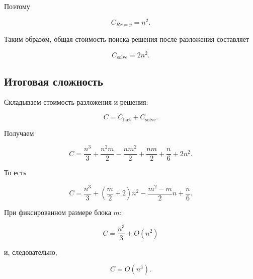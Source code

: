 \documentclass[a4paper,12pt]{article}
\begin{document}
Поэтому

$$
C_{Rx=y}=n^2.
$$

Таким образом, общая стоимость поиска решения после разложения составляет

$$
C_{\text{solve}}
=
2n^2.
$$

\subsection{Итоговая сложность}

Складываем стоимость разложения и решения:

$$
C
=
C_{\text{fact}}
+
C_{\text{solve}}.
$$

Получаем

$$
C
=
\frac{n^3}{3}
+
\frac{n^2m}{2}
-
\frac{nm^2}{2}
+
\frac{nm}{2}
+
\frac{n}{6}
+
2n^2.
$$

То есть

$$
\boxed{
  C
  =
  \frac{n^3}{3}
  +
  \left(\frac{m}{2}+2\right)n^2
  -
  \frac{m^2-m}{2}n
  +
  \frac{n}{6}
}.
$$

При фиксированном размере блока \(m\):

$$
\boxed{
  C
  =
  \frac{n^3}{3}
  +
  O(n^2)
}
$$

и, следовательно,

$$
\boxed{
  C=O(n^3).
}
$$
\end{document}

